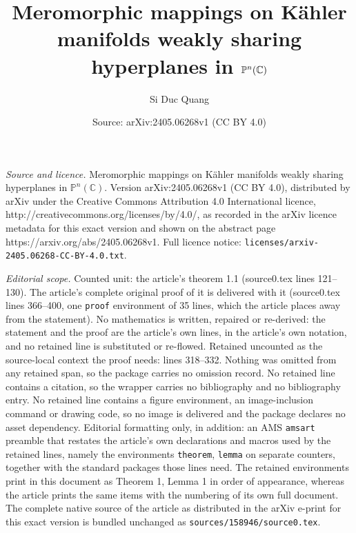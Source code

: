 \documentclass[10pt,a4paper]{amsart}
\title{Meromorphic mappings on K\"{a}hler manifolds weakly sharing hyperplanes in $\P^n(\C)$}
\author{Si Duc Quang}
\date{Source: arXiv:2405.06268v1 (CC BY 4.0)}
\newcommand{\C}{{\mathbb{C}}}
\renewcommand{\P}{{\mathbb{P}}}
\begin{document}
\maketitle

\noindent\emph{Source and licence.} Meromorphic mappings on K\"{a}hler manifolds weakly sharing hyperplanes in $\P^n(\C)$. Version arXiv:2405.06268v1 (CC BY 4.0), distributed by arXiv under the Creative Commons Attribution 4.0 International licence, http://creativecommons.org/licenses/by/4.0/, as recorded in the arXiv licence metadata for this exact version and shown on the abstract page https://arxiv.org/abs/2405.06268v1. Full licence notice: \texttt{licenses/arxiv-2405.06268-CC-BY-4.0.txt}.\par\smallskip

\noindent\textit{Editorial scope.} Counted unit: the article's theorem 1.1 (source0.tex lines 121--130). The article's complete original proof of it is delivered with it (source0.tex lines 366--400, one \texttt{proof} environment of 35 lines, which the article places away from the statement). No mathematics is written, repaired or re-derived: the statement and the proof are the article's own lines, in the article's own notation, and no retained line is substituted or re-flowed.  Retained uncounted as the source-local context the proof needs: lines 318--332.  Nothing was omitted from any retained span, so the package carries no omission record.  No retained line contains a citation, so the wrapper carries no bibliography and no bibliography entry.  No retained line contains a figure environment, an image-inclusion command or drawing code, so no image is delivered and the package declares no asset dependency.  Editorial formatting only, in addition: an AMS \texttt{amsart} preamble that restates the article's own declarations and macros used by the retained lines, namely the environments \texttt{theorem}, \texttt{lemma} on separate counters, together with the standard packages those lines need.  The retained environments print in this document as Theorem 1, Lemma 1 in order of appearance, whereas the article prints the same items with the numbering of its own full document.  The complete native source of the article as distributed in the arXiv e-print for this exact version is bundled unchanged as \texttt{sources/158946/source0.tex}.
\end{document}
